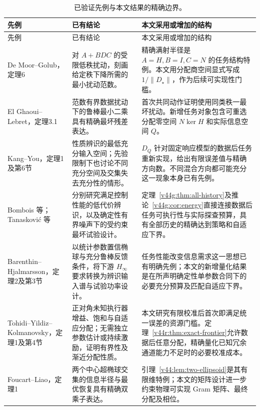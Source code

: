 \documentclass[11pt,a4paper]{article}
\numberwithin{equation}{section}
\theoremstyle{definition}
\begin{document}
\begin{center}\small
\renewcommand{\arraystretch}{1.17}
\begin{longtable}{p{.21\linewidth}p{.345\linewidth}p{.345\linewidth}}
\caption{已验证先例与本文结果的精确边界。}\label{tab:rev-related}\\
\toprule
先例 & 已有结论 & 本文采用或增加的结构\\
\midrule
\endfirsthead
\toprule 先例 & 已有结论 & 本文采用或增加的结构\\\midrule
\endhead
\bottomrule\endfoot
De Moor--Golub\cite{demoorgolub1991}，定理6
& 对 $A+BDC$ 的受限低秩扰动，刻画给定秩下降所需的最小扰动范数。
& 精确满射半径是 $A=H,B=I,C=N$ 的任务结构特例。本文用分配商空间显式写成 $1/\|D_\star\|$，作为后续可实现性门槛。\\
El Ghaoui--Lebret\cite{elghaoui1997}，定理3.1
& 范数有界数据扰动下的鲁棒最小二乘具有精确最坏残差表达。
& 首次共同动作证明使用同类秩一最坏扰动。新增任务对象包含可重选分配零空间 $N\ker H$ 和实际信息空间 $Q$。\\
Kang--You\cite{kang2023}，定理1及第6节
& 性质辨识的最低充分输入空间；先验限制下也讨论不同充分空间及交集失去充分性的情形。
& $D_Q$ 针对固定响应模型的数据后任务重新实现，给出有限误差值与精确方向数。不同混合方向都可能充分这一现象本身已有先例。\\
Bombois 等\cite{bombois2006}；Tanaskovi\'c 等\cite{tanaskovic2014}
& 分别研究满足控制性能的低代价辨识，以及确定性有界噪声下的受约束最坏试验设计。
& 定理~\ref{v44g:thm:all-history}及推论~\ref{v44g:cor:energy}直接连接数据后任务可执行性与实际探查预算，具有全部历史的精确达到策略和自适应下界。\\
Barenthin--Hjalmarsson\cite{barenthin2005}，定理2及第3节
& 以统计参数置信椭球与充分鲁棒反馈条件，将下游 $H_\infty$ 要求转换为辨识输入谱与试验功率设计。
& 任务性能改变信息需求这一思想已有明确先例；本文的新增量化结果是在所声明确定性单参数合同下的必要充分预算及匹配自适应下界。\\
Tohidi--Yildiz--Kolmanovsky\cite{tohidi2020}，定理1及第4节
& 正对角未知执行器增益、饱和与自适应分配；无需独立参数估计或持续激励，证明有界性及渐近分配性质。
& 本文研究有限校准后首次即满足统一误差的资源门槛。定理~\ref{v44r:thm:exact-frontier}允许数据后任意分配，精确量化已知冗余通道能力不足时的必要校准成本。\\
Foucart--Liao\cite{foucart2024}，定理1
& 两个中心超椭球交集的信息半径与最优恢复具有精确双乘子表达。
& 引理~\ref{v44:lem:two-ellipsoid}是其有限维特例；本文的矩阵设计进一步约束物理可实现 Gram 矩阵、最终分配及相位。\\

\end{longtable}
\end{center}
\end{document}
